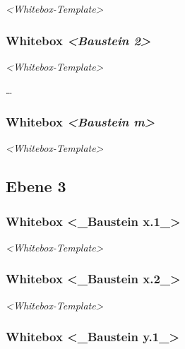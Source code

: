 \documentclass[
]{article}
\begin{document}
\emph{\textless Whitebox-Template\textgreater{}}

\hypertarget{_whitebox_emphasis_baustein_2_emphasis}{%
  \subsubsection{\texorpdfstring{Whitebox \emph{\textless Baustein
        2\textgreater{}}}{Whitebox \textless Baustein 2\textgreater{}}}\label{_whitebox_emphasis_baustein_2_emphasis}}

\emph{\textless Whitebox-Template\textgreater{}}

\ldots{}

\hypertarget{_whitebox_emphasis_baustein_m_emphasis}{%
  \subsubsection{\texorpdfstring{Whitebox \emph{\textless Baustein
        m\textgreater{}}}{Whitebox \textless Baustein m\textgreater{}}}\label{_whitebox_emphasis_baustein_m_emphasis}}

\emph{\textless Whitebox-Template\textgreater{}}

\hypertarget{_ebene_3}{%
  \subsection{Ebene 3}\label{_ebene_3}}

\hypertarget{_whitebox_baustein_x_1}{%
  \subsubsection{Whitebox \textless\_Baustein
    x.1\_\textgreater{}}\label{_whitebox_baustein_x_1}}

\emph{\textless Whitebox-Template\textgreater{}}

\hypertarget{_whitebox_baustein_x_2}{%
  \subsubsection{Whitebox \textless\_Baustein
    x.2\_\textgreater{}}\label{_whitebox_baustein_x_2}}

\emph{\textless Whitebox-Template\textgreater{}}

\hypertarget{_whitebox_baustein_y_1}{%
  \subsubsection{Whitebox \textless\_Baustein
    y.1\_\textgreater{}}\label{_whitebox_baustein_y_1}}
\end{document}
